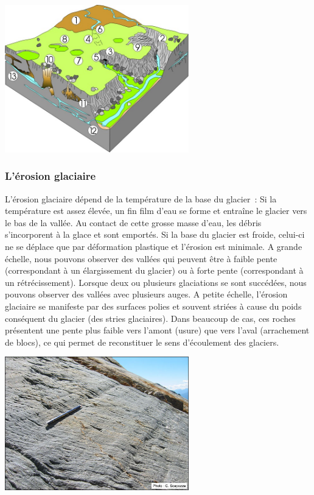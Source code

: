 \documentclass[a4paper,11pt]{article}
\begin{document}
\begin{center}
  \includegraphics[width=8cm]{Images/Erosion/karst_new_col.jpg}
\end{center}

\subsubsection{L'érosion glaciaire}

L'érosion glaciaire dépend de la température de la base du glacier~:
Si la température est assez élevée, un fin film d'eau se forme et entraîne le glacier vers le bas de la vallée. Au contact de cette grosse masse d'eau, les débris s'incorporent à la glace et sont emportés.
Si la base du glacier est froide, celui-ci ne se déplace que par déformation plastique et l'érosion est minimale.
A grande échelle, nous pouvons observer des vallées qui peuvent être à faible pente (correspondant à un élargissement du glacier) ou à forte pente (correspondant à un rétrécissement).
Lorsque deux ou plusieurs glaciations se sont succédées, nous pouvons observer des vallées avec plusieurs auges. 
A petite échelle, l'érosion glaciaire se manifeste par des surfaces polies et souvent striées à cause du poids conséquent du glacier (des stries glaciaires).
Dans beaucoup de cas, ces roches présentent une pente plus faible vers l'amont (usure) que vers l'aval (arrachement de blocs), ce qui permet de reconstituer le sens d'écoulement des glaciers.

\begin{center}
  \includegraphics[width=8cm]{Images/Erosion/stries_glaciaires.jpg}
\end{center}
\end{document}

